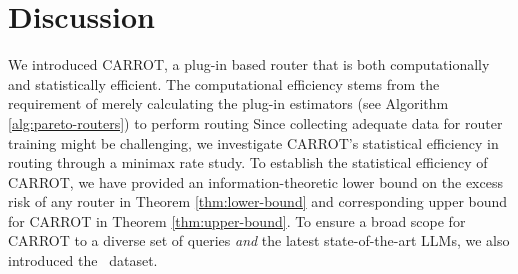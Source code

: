 \section{Discussion}
\label{sec:discussion}

We introduced CARROT, a plug-in based router that is both computationally and statistically efficient. The computational efficiency stems from the requirement of merely calculating the plug-in estimators (see Algorithm \ref{alg:pareto-routers}) to  perform routing %
Since collecting adequate data for router training might be challenging, we investigate CARROT's statistical efficiency in routing through a minimax rate study. To establish the statistical efficiency of CARROT, we have provided an information-theoretic lower bound on the excess risk of any router in Theorem \ref{thm:lower-bound} and corresponding upper bound for CARROT in Theorem \ref{thm:upper-bound}. To ensure a broad scope for CARROT to a diverse set of queries \emph{and} the latest state-of-the-art LLMs, we also introduced the \newdata\ dataset. %

